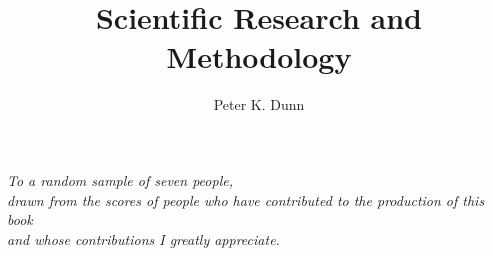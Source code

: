 

\frontmatter

\title{Scientific Research and Methodology} %
\author{Peter K. Dunn}


\halftitle

\booktitle

\locpage

\cleardoublepage
\thispagestyle{empty}
\begin{center}
\Large\itshape
To a random sample of seven people,\\ 
drawn from the scores of people who have contributed to the production of this book\\
and whose contributions I greatly appreciate.
\end{center}
%

\cleardoublepage
\setcounter{page}{7} %
%
%
%
%



